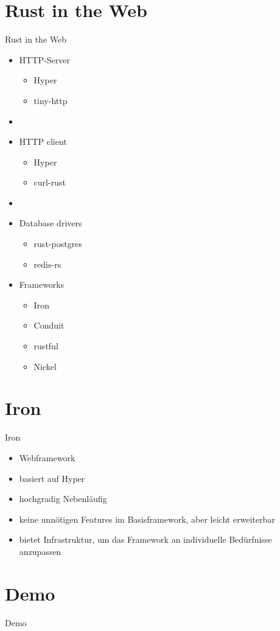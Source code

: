\documentclass[12pt]{beamer}
\begin{document}
\section{Rust in the Web}

\begin{frame}{Rust in the Web}

\begin{minipage}[t]{.45\textwidth}
\begin{itemize}
  \item HTTP-Server
  \begin{itemize}
    \item Hyper
    \item tiny-http
  \end{itemize}
  \item []
  \item HTTP client
  \begin{itemize}
    \item Hyper
    \item curl-rust
  \end{itemize} 
  \item []
  \item Database drivers
  \begin{itemize}
    \item rust-postgres
    \item redis-rs
  \end{itemize}
\end{itemize}
\end{minipage}
\hfill
\begin{minipage}[t]{.45\textwidth}
\begin{itemize}
\item Frameworks
  \begin{itemize}
    \item Iron
    \item Conduit
    \item rustful
    \item Nickel
  \end{itemize}  
\end{itemize}
\end{minipage}

\end{frame}

\section{Iron}
\begin{frame}{Iron}
\begin{itemize}
    \item Webframework
    \item basiert auf Hyper
    \item hochgradig Nebenläufig
    \item keine unnötigen Features im Basisframework, aber leicht erweiterbar
    \item bietet Infrastruktur, um das Framework an individuelle Bedürfnisse anzupassen
\end{itemize}

\end{frame}


\section{Demo}
\begin{frame}{Demo}

\end{frame}
\end{document}
